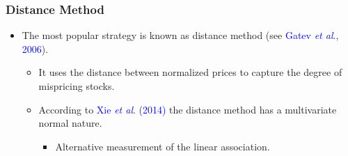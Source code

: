 \documentclass[pdf,9pt,xcolor=dvipsnames,hide notes]{beamer}
\begin{document}
\begin{frame}[label=frame1]
\frametitle{Distance Method}


\begin{itemize}
	\justifying
			
			\item The most popular strategy is known as distance method (see \textcolor{blue}{Gatev \emph{et al}}., \textcolor{blue}{2006}). 
			
		   \begin{itemize}
		   	\setlength\itemsep{1em}
			
			\item It uses the distance between normalized prices to capture the degree of mispricing stocks. 
			
			\pause
		
			\item According to \textcolor{blue}{Xie \emph{et al}}. \textcolor{blue}{(2014)} the distance method has a multivariate normal nature.
				\begin{itemize} 
			 	\item Alternative measurement of the linear association.
				\end{itemize}
			\end{itemize}
			
		\end{itemize}	
	\end{frame}
\end{document}

